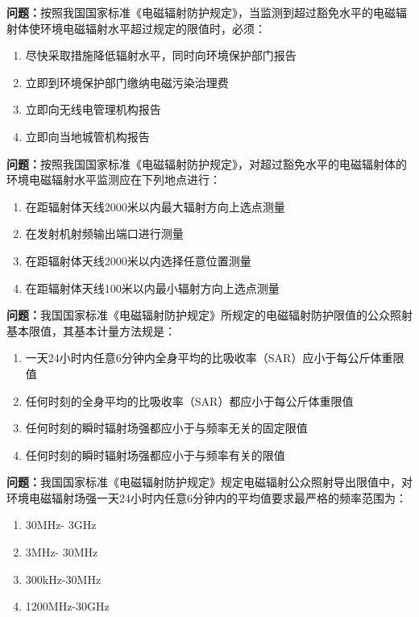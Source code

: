 \bigskip


\noindent\textbf{问题：}按照我国国家标准《电磁辐射防护规定》，当监测到超过豁免水平的电磁辐射体使环境电磁辐射水平超过规定的限值时，必须：
\begin{enumerate}[label=\Alph*), leftmargin=3em]
	\item 尽快采取措施降低辐射水平，同时向环境保护部门报告
	\item 立即到环境保护部门缴纳电磁污染治理费
	\item 立即向无线电管理机构报告
	\item 立即向当地城管机构报告
\end{enumerate}

\bigskip


\noindent\textbf{问题：}按照我国国家标准《电磁辐射防护规定》，对超过豁免水平的电磁辐射体的环境电磁辐射水平监测应在下列地点进行：
\begin{enumerate}[label=\Alph*), leftmargin=3em]
	\item 在距辐射体天线2000米以内最大辐射方向上选点测量
	\item 在发射机射频输出端口进行测量
	\item 在距辐射体天线2000米以内选择任意位置测量
	\item 在距辐射体天线100米以内最小辐射方向上选点测量
\end{enumerate}

\bigskip


\noindent\textbf{问题：}我国国家标准《电磁辐射防护规定》所规定的电磁辐射防护限值的公众照射基本限值，其基本计量方法规是：
\begin{enumerate}[label=\Alph*), leftmargin=3em]
	\item 一天24小时内任意6分钟内全身平均的比吸收率（SAR）应小于每公斤体重限值
	\item 任何时刻的全身平均的比吸收率（SAR）都应小于每公斤体重限值
	\item 任何时刻的瞬时辐射场强都应小于与频率无关的固定限值
	\item 任何时刻的瞬时辐射场强都应小于与频率有关的限值
\end{enumerate}

\bigskip


\noindent\textbf{问题：}我国国家标准《电磁辐射防护规定》规定电磁辐射公众照射导出限值中，对环境电磁辐射场强一天24小时内任意6分钟内的平均值要求最严格的频率范围为：
\begin{enumerate}[label=\Alph*), leftmargin=3em]
	\item 30MHz- 3GHz
	\item 3MHz- 30MHz
	\item 300kHz-30MHz
	\item 1200MHz-30GHz
\end{enumerate}

